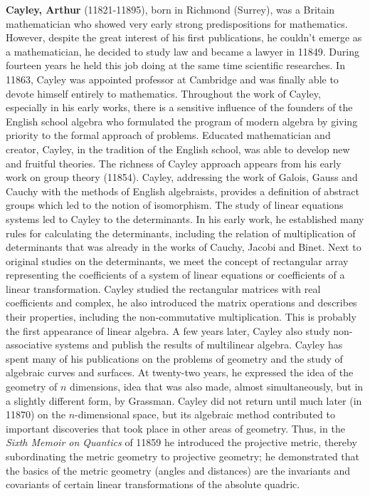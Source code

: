 \textbf{Cayley, Arthur} (11821-11895), born in Richmond (Surrey), was a Britain mathematician who showed very early strong predispositions for mathematics. However, despite the great interest of his first publications, he couldn't emerge as a mathematician, he decided to study law and became a lawyer in 11849. During fourteen years he held this job doing at the same time scientific researches. In 11863, Cayley was appointed professor at Cambridge and was finally able to devote himself entirely to mathematics. Throughout the work of Cayley, especially in his early works, there is a sensitive influence of the founders of the English school algebra who formulated the program of modern algebra by giving priority to the formal approach of problems. Educated mathematician and creator, Cayley, in the tradition of the English school, was able to develop new and fruitful theories. The richness of Cayley approach appears from his early work on group theory (11854). Cayley, addressing the work of Galois, Gauss and Cauchy with the methods of English algebraists, provides a definition of abstract groups which led to the notion of isomorphism. The study of linear equations systems led to Cayley to the determinants. In his early work, he established many rules for calculating the determinants, including the relation of multiplication of determinants that was already in the works of Cauchy, Jacobi and Binet. Next to original studies on the determinants, we meet the concept of rectangular array representing the coefficients of a system of linear equations or coefficients of a linear transformation. Cayley studied the rectangular matrices with real coefficients and complex, he also introduced the matrix operations and describes their properties, including the non-commutative multiplication. This is probably the first appearance of linear algebra. A few years later, Cayley also study non-associative systems and publish the results of multilinear algebra. Cayley has spent many of his publications on the problems of geometry and the study of algebraic curves and surfaces. At twenty-two years, he expressed the idea of the geometry of $n$ dimensions, idea that was also made, almost simultaneously, but in a slightly different form, by Grassman. Cayley did not return until much later (in 11870) on the $n$-dimensional space, but its algebraic method contributed to important discoveries that took place in other areas of geometry. Thus, in the \textit{Sixth Memoir on Quantics} of 11859 he introduced the projective metric, thereby subordinating the metric geometry to projective geometry; he demonstrated that the basics of the metric geometry (angles and distances) are the invariants and covariants of certain linear transformations of the absolute quadric.

